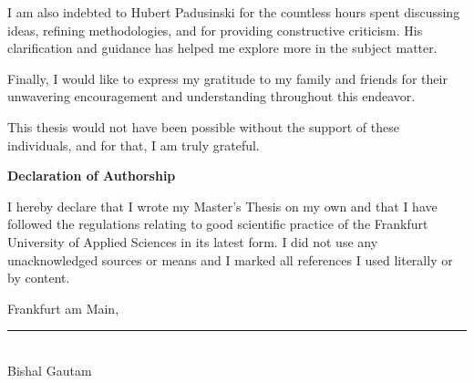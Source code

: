 {\begin{titlepage}
    I am also indebted to Hubert Padusinski for the countless hours spent discussing ideas, refining methodologies, and for providing constructive criticism. His clarification and guidance has helped me explore more in the subject matter.

    Finally, I would like to express my gratitude to my family and friends for their unwavering encouragement and understanding throughout this endeavor.

    This thesis would not have been possible without the support of these individuals, and for that, I am truly grateful.
 \vspace*{\fill}
\end{titlepage}



\begin{titlepage}
    \vspace*{\fill}
    {\Large\textbf{Declaration of Authorship}\par}\bigskip%
    I hereby declare that I wrote my Master's Thesis on my own and that I have followed the regulations relating to good scientific practice of the Frankfurt University of Applied Sciences in its latest form. I did not use any unacknowledged sources or means and I marked all references I used literally or by content.\par\bigskip%
    Frankfurt am Main, \EndDatum\par\vspace{5ex}%
    \vspace{2ex}
    \rule{4cm}{0.4pt} %
    \vspace{0.5em} \\ Bishal Gautam
    \vspace*{\fill}
\end{titlepage}



}

\maketitle
